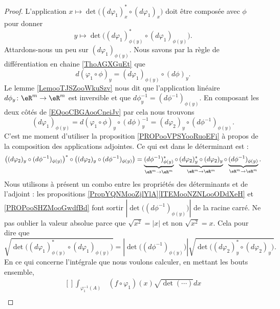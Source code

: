 \begin{proof}
	L'application \( x\mapsto \det\big( (d\varphi_1)_x^*\circ(d\varphi_1)_x \big)\) doit être composée avec \( \phi\) pour donner
	\begin{equation}
		y\mapsto\det\big( (d\varphi_1)_{\phi(y)}^*\circ(d\varphi_1)_{\phi(y)} \big).
	\end{equation}
	Attardons-nous un peu sur \( (d\varphi_1)_{\phi(y)}\). Nous savons par la règle de différentiation en chaine \ref{ThoAGXGuEt} que
	\begin{equation}        \label{EQooCBGAooCneiJv}
		d(\varphi_1\circ \phi)_y=(d\varphi_1)_{\phi(y)}\circ(d\phi)_y.
	\end{equation}
	Le lemme \ref{LemooTJSZooWkuSzv} nous dit que l'application linéaire \( d\phi_y\colon \eR^m\to \eR^m\) est inversible et que \( d\phi_y^{-1}=(d\phi^{-1})_{\phi(y)}\). En composant les deux côtés de \eqref{EQooCBGAooCneiJv} par cela nous trouvons
	\begin{equation}
		(d\varphi_1)_{\phi(y)}=d(\varphi_1\circ\phi)_y\circ(d\phi)_y^{-1}=(d\varphi_2)_y\circ(d\phi^{-1})_{\phi(y)}.
	\end{equation}
	C'est me moment d'utiliser la proposition \ref{PROPooVPSYooRuoEFi} à propos de la composition des applications adjointes. Ce qui est dans le déterminant est :
	\begin{equation}
		\big( (d\varphi_2)_y\circ(d\phi^{-1})_{\phi(y)} \big)^*\circ\big( (d\varphi_2)_y\circ(d\phi^{-1})_{\phi(y)} \big)=
		\underbrace{(d\phi^{-1})_{\phi(y)}^*}_{\eR^m\to \eR^m}\circ\underbrace{(d\varphi_2)^*_y\circ(d\varphi_2)_y}_{\eR^m\to \eR^m}\circ\underbrace{(d\phi^{-1})_{\phi(y)}}_{\eR^m\to \eR^m}.
	\end{equation}
	Nous utilisons à présent un combo entre les propriétés des déterminants et de l'adjoint : les propositions \ref{PropYQNMooZjlYlA}\ref{ITEMooNZNLooODdXeH} et \ref{PROPooSHZMooGwdfBd} font sortir \( | \det\big( (d\phi^{-1})_{\phi(y)} \big) |\) de la racine carré. Ne pas oublier la valeur absolue parce que \( \sqrt{ x^2 }=| x |\) et non \( \sqrt{ x^2 }=x\). Cela pour dire que
	\begin{equation}
		\sqrt{ \det\big( (d\varphi_1)_{\phi(y)}^*\circ(d\varphi_1)_{\phi(y)} \big) }=| \det\big( (d\phi^{-1})_{\phi(y)} \big) |\sqrt{ \det\big( (d\varphi_2)_y^*\circ(d\varphi_2)_y \big) }.
	\end{equation}
	En ce qui concerne l'intégrale que nous voulons calculer, en mettant les bouts ensemble,
	\begin{equation}
		\begin{aligned}[]
			\int_{\varphi_1^{-1}(A)} & (f\circ\varphi_1)(x)\sqrt{ \det(\cdots) }dx                                                                                                                             \\

\end{aligned}
\end{equation}
\end{proof}
